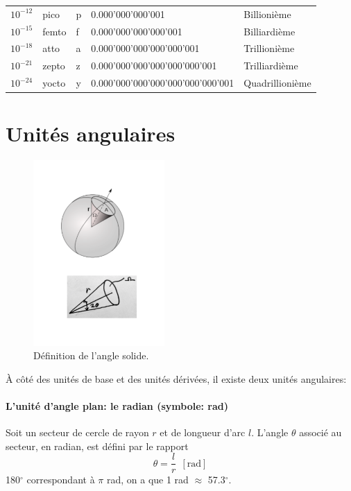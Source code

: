 \begin{table}[htbp]
\begin{center}
\begin{tabular}{>{\pbs\raggedright}p{1cm}>{\pbs\raggedright}p{1.4cm}>{\pbs\centering}p{1.5cm}ll}
            $10^{-12	}$ & pico    & p       & 0.000'000'000'001                 & Billionième     \\
            $10^{-15	}$ & femto   & f       & 0.000'000'000'000'001             & Billiardième    \\
            $10^{-18	}$ & atto    & a       & 0.000'000'000'000'000'001         & Trillionième    \\
            $10^{-21	}$ & zepto   & z       & 0.000'000'000'000'000'000'001     & Trilliardième   \\
            $10^{-24	}$ & yocto   & y       & 0.000'000'000'000'000'000'000'001 & Quadrillionième \\ \hline
        \end{tabular}
    \end{center}
\end{table}

\newpage

\section{Unités angulaires}

\begin{figure}
    \centering
    \includegraphics[width=5cm]{assets/figures/defAngleSolide.pdf}
    \caption{Définition de l'angle solide.}
    \label{fig:angles}
\end{figure}
À côté des unités de base et des unités dérivées, il existe deux unités angulaires:

\paragraph{L'unité d'angle plan: le radian (symbole: rad)} Soit un secteur de cercle de rayon $r$ et de longueur d'arc $l$. L'angle $\theta$ associé au secteur, en radian, est défini par le rapport
$$
    \theta=\frac{l}{r}\ \ [\text{rad}]
$$
180$^\circ$ correspondant à $\pi$ rad, on a que 1 rad $\approx$ 57.3$^\circ$.

